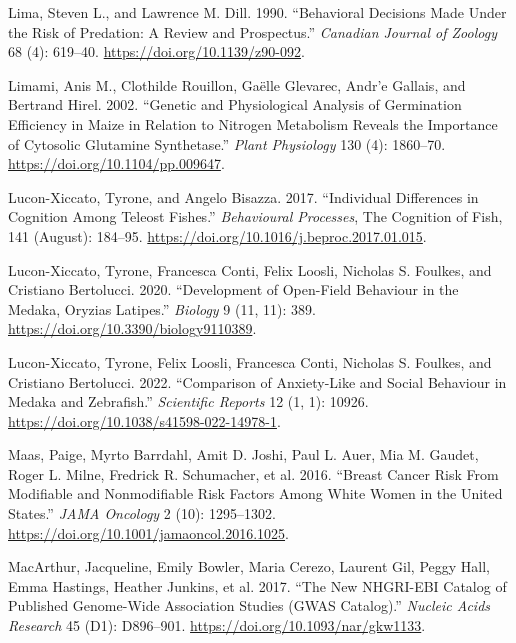 \documentclass[
]{book}
\newlength{\cslhangindent}
\newlength{\cslentryspacingunit} %
\newenvironment{CSLReferences}[2] %
 {%
  \setlength{\parindent}{0pt}
  \ifodd #1
  \let\oldpar\par
  \def\par{\hangindent=\cslhangindent\oldpar}
  \fi
  \setlength{\parskip}{#2\cslentryspacingunit}
 }%
 {}
\begin{document}
\begin{CSLReferences}{1}{0}
\leavevmode{}%
Lima, Steven L., and Lawrence M. Dill. 1990. {``Behavioral Decisions Made Under the Risk of Predation: A Review and Prospectus.''} \emph{Canadian Journal of Zoology} 68 (4): 619--40. \url{https://doi.org/10.1139/z90-092}.

\leavevmode{}%
Limami, Anis M., Clothilde Rouillon, Gaëlle Glevarec, Andr'e Gallais, and Bertrand Hirel. 2002. {``Genetic and {Physiological Analysis} of {Germination Efficiency} in {Maize} in {Relation} to {Nitrogen Metabolism Reveals} the {Importance} of {Cytosolic Glutamine Synthetase}.''} \emph{Plant Physiology} 130 (4): 1860--70. \url{https://doi.org/10.1104/pp.009647}.

\leavevmode{}%
Lucon-Xiccato, Tyrone, and Angelo Bisazza. 2017. {``Individual Differences in Cognition Among Teleost Fishes.''} \emph{Behavioural Processes}, The {Cognition} of {Fish}, 141 (August): 184--95. \url{https://doi.org/10.1016/j.beproc.2017.01.015}.

\leavevmode{}%
Lucon-Xiccato, Tyrone, Francesca Conti, Felix Loosli, Nicholas S. Foulkes, and Cristiano Bertolucci. 2020. {``Development of {Open-Field Behaviour} in the {Medaka}, {Oryzias} Latipes.''} \emph{Biology} 9 (11, 11): 389. \url{https://doi.org/10.3390/biology9110389}.

\leavevmode{}%
Lucon-Xiccato, Tyrone, Felix Loosli, Francesca Conti, Nicholas S. Foulkes, and Cristiano Bertolucci. 2022. {``Comparison of Anxiety-Like and Social Behaviour in Medaka and Zebrafish.''} \emph{Scientific Reports} 12 (1, 1): 10926. \url{https://doi.org/10.1038/s41598-022-14978-1}.

\leavevmode{}%
Maas, Paige, Myrto Barrdahl, Amit D. Joshi, Paul L. Auer, Mia M. Gaudet, Roger L. Milne, Fredrick R. Schumacher, et al. 2016. {``Breast {Cancer Risk From Modifiable} and {Nonmodifiable Risk Factors Among White Women} in the {United States}.''} \emph{JAMA Oncology} 2 (10): 1295--1302. \url{https://doi.org/10.1001/jamaoncol.2016.1025}.

\leavevmode{}%
MacArthur, Jacqueline, Emily Bowler, Maria Cerezo, Laurent Gil, Peggy Hall, Emma Hastings, Heather Junkins, et al. 2017. {``The New {NHGRI-EBI Catalog} of Published Genome-Wide Association Studies ({GWAS Catalog}).''} \emph{Nucleic Acids Research} 45 (D1): D896--901. \url{https://doi.org/10.1093/nar/gkw1133}.


\end{CSLReferences}
\end{document}
